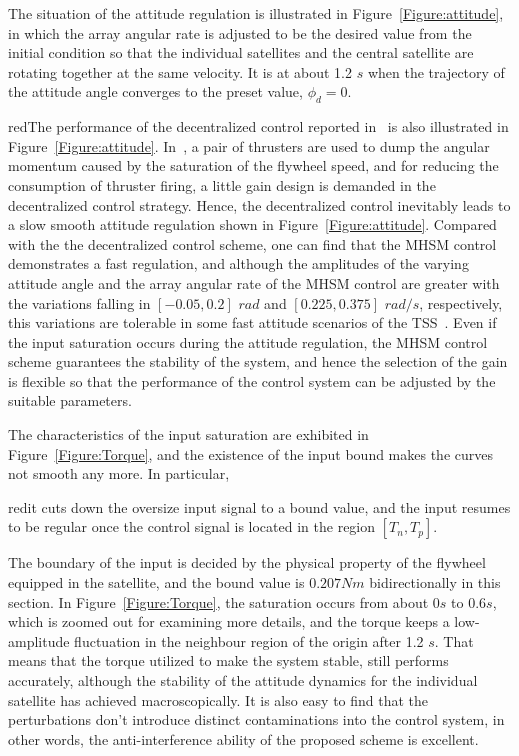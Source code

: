 The situation of the attitude regulation is illustrated in Figure~\ref{Figure:attitude}, in which the array angular rate is adjusted to be the desired value from the initial condition so that the individual satellites and the central satellite are rotating together at the same velocity. It is at about 1.2 $s$ when the trajectory of the attitude angle converges to the preset value, $\phi_d = 0$. \begin{color}{red}The performance of the decentralized control reported in~\cite{chung2008propellant1} is also illustrated in Figure~\ref{Figure:attitude}. In~\cite{chung2008propellant1}, a pair of thrusters are used to dump the angular momentum caused by the saturation of the flywheel speed, and for reducing the consumption of thruster firing, a little gain design is demanded in the decentralized control strategy. Hence, the decentralized control inevitably leads to a slow smooth attitude regulation shown in Figure~\ref{Figure:attitude}. Compared with the the decentralized control scheme, one can find that the MHSM control demonstrates a fast regulation, and although the amplitudes of the varying attitude angle and the array angular rate of the MHSM control are greater with the variations falling in $[-0.05,0.2]$ $rad$ and $[0.225,0.375]$ $rad/s$, respectively, this variations are tolerable in some fast attitude scenarios of the TSS~\cite{Williams2009745}. Even if the input saturation occurs during the attitude regulation, the MHSM control scheme guarantees the stability of the system, and hence the selection of the gain is flexible so that the performance of the control system can be adjusted by the suitable parameters. \end{color}\par
The characteristics of the input saturation are exhibited in Figure~\ref{Figure:Torque}, and the existence of the input bound makes the curves not smooth any more. In particular, \begin{color}{red}it cuts down the oversize input signal to a bound value, and the input resumes to be regular once the control signal is located in the region $[T_n,T_p]$.\end{color} The boundary of the input is decided by the physical property of the flywheel equipped in the satellite, and the bound value is $0.207Nm$ bidirectionally in this section. In Figure~\ref{Figure:Torque}, the saturation occurs from about $0s$ to $0.6s$, which is zoomed out for examining more details, and the torque keeps a low-amplitude fluctuation in the neighbour region of the origin after 1.2 $s$. That means that the torque utilized to make the system stable, still performs accurately, although the stability of the attitude dynamics for the individual satellite has achieved macroscopically. It is also easy to find that the perturbations don't introduce distinct contaminations into the control system, in other words, the anti-interference ability of the proposed scheme is excellent.

